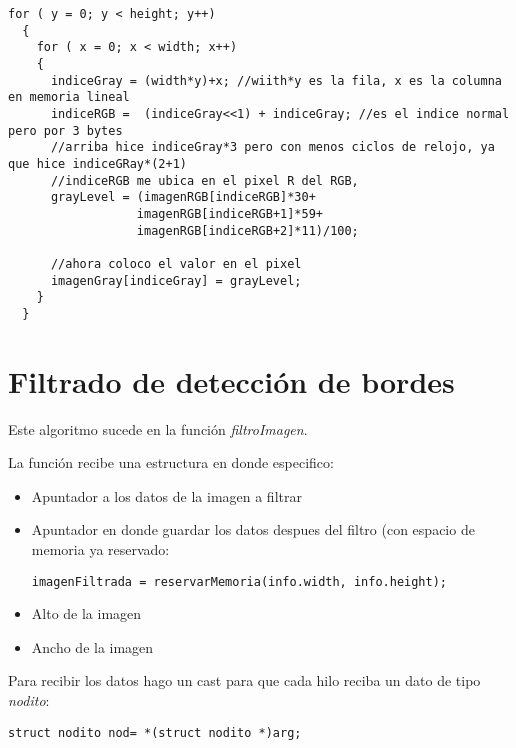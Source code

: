 \documentclass[11pt,a4paper]{article}
\begin{document}
\lstset{language=C, breaklines=true, basicstyle=\footnotesize}
\lstset{numbers=left, numberstyle=\tiny, stepnumber=1, numbersep=-2pt}
\begin{lstlisting}[frame=single]
  for ( y = 0; y < height; y++)
  {
    for ( x = 0; x < width; x++)
    {
      indiceGray = (width*y)+x; //wiith*y es la fila, x es la columna en memoria lineal
      indiceRGB =  (indiceGray<<1) + indiceGray; //es el indice normal pero por 3 bytes
      //arriba hice indiceGray*3 pero con menos ciclos de relojo, ya que hice indiceGRay*(2+1)
      //indiceRGB me ubica en el pixel R del RGB,
      grayLevel = (imagenRGB[indiceRGB]*30+ 
                  imagenRGB[indiceRGB+1]*59+
                  imagenRGB[indiceRGB+2]*11)/100;

      //ahora coloco el valor en el pixel
      imagenGray[indiceGray] = grayLevel;
    }
  }

\end{lstlisting}

\section{Filtrado de detección de bordes}

Este algoritmo sucede en la función \textit{filtroImagen}.

La función recibe una estructura en donde especifico:

\begin{itemize}
\item Apuntador a los datos de la imagen a filtrar
\item Apuntador en donde guardar los datos despues del filtro (con espacio de memoria ya reservado:

\lstset{language=C, breaklines=true, basicstyle=\footnotesize}
\lstset{numbers=left, numberstyle=\tiny, stepnumber=1, numbersep=-2pt}
\begin{lstlisting}[frame=single]
 imagenFiltrada = reservarMemoria(info.width, info.height);
\end{lstlisting}

\item Alto de la imagen
\item Ancho de la imagen
\end{itemize}

Para recibir los datos hago un cast para que cada hilo reciba un dato de tipo \textit{nodito}:

\lstset{language=C, breaklines=true, basicstyle=\footnotesize}
\lstset{numbers=left, numberstyle=\tiny, stepnumber=1, numbersep=-2pt}
\begin{lstlisting}[frame=single]
  struct nodito nod= *(struct nodito *)arg;
\end{lstlisting}
\end{document}
